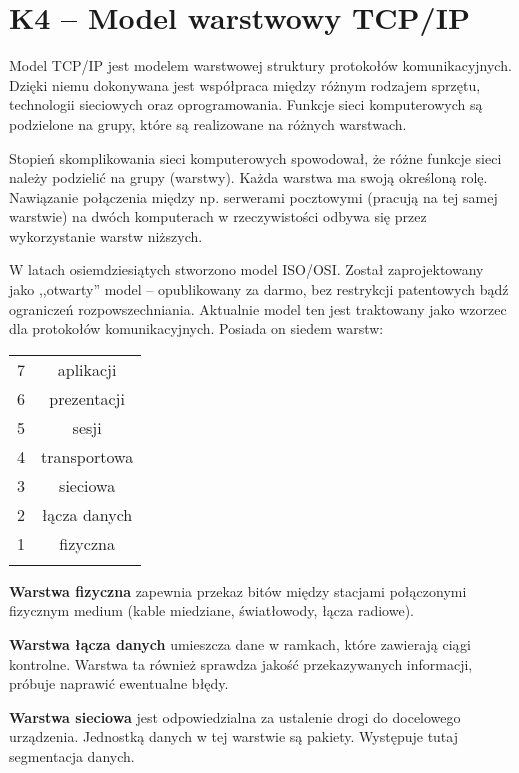 \section{K4 -- Model warstwowy TCP/IP}
Model TCP/IP jest modelem warstwowej struktury protokołów komunikacyjnych. Dzięki niemu dokonywana jest współpraca między różnym rodzajem sprzętu, technologii sieciowych oraz oprogramowania. Funkcje sieci komputerowych są podzielone na grupy, które są realizowane na różnych warstwach.

Stopień skomplikowania sieci komputerowych spowodował, że różne funkcje sieci należy podzielić na grupy (warstwy). Każda warstwa ma swoją określoną rolę. Nawiązanie połączenia między np. serwerami pocztowymi (pracują na tej samej warstwie) na dwóch komputerach w rzeczywistości odbywa się przez wykorzystanie warstw niższych.

W latach osiemdziesiątych stworzono model ISO/OSI. Został zaprojektowany jako ,,otwarty'' model -- opublikowany za darmo, bez restrykcji patentowych bądź ograniczeń rozpowszechniania. Aktualnie model ten jest traktowany jako wzorzec dla protokołów komunikacyjnych. Posiada on siedem warstw:
\begin{table}[H]
	\centering
	\begin{tabular}{c|c|} \hhline{~-}
		7 & \cellcolor{blue!20}aplikacji    \\ \hhline{~-}
		6 & \cellcolor{blue!20}prezentacji  \\ \hhline{~-}
		5 & \cellcolor{blue!20}sesji        \\ \hhline{~-}
		4 & \cellcolor{red!20}transportowa \\ \hhline{~-}
		3 & \cellcolor{green!20}sieciowa     \\ \hhline{~-}
		2 & \cellcolor{yellow!20}łącza danych \\ \hhline{~-}
		1 & \cellcolor{yellow!20}fizyczna     \\ \hhline{~-}
	\end{tabular}
\end{table}

\textbf{Warstwa fizyczna} zapewnia przekaz bitów między stacjami połączonymi fizycznym medium (kable miedziane, światłowody, łącza radiowe).

\textbf{Warstwa łącza danych} umieszcza dane w ramkach, które zawierają ciągi kontrolne. Warstwa ta również sprawdza jakość przekazywanych informacji, próbuje naprawić ewentualne błędy.

\textbf{Warstwa sieciowa} jest odpowiedzialna za ustalenie drogi do docelowego urządzenia. Jednostką danych w tej warstwie są pakiety. Występuje tutaj segmentacja danych.

